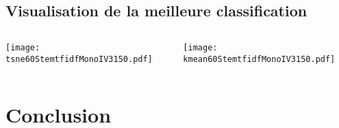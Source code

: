 \documentclass[8pt,aspectratio=169,hyperref={unicode=true}]{beamer}
\begin{document}
\subsection{Visualisation de la meilleure classification}
\begin{frame}{\insertsubsection}
    \begin{columns}
        \begin{column}{.5\textwidth}
            \texttt{[image: tsne60StemtfidfMonoIV3150.pdf]}
        \end{column}
        \begin{column}{.5\textwidth}
            \texttt{[image: kmean60StemtfidfMonoIV3150.pdf]}
        \end{column}
    \end{columns}
\end{frame}


\section{Conclusion}
\end{document}
